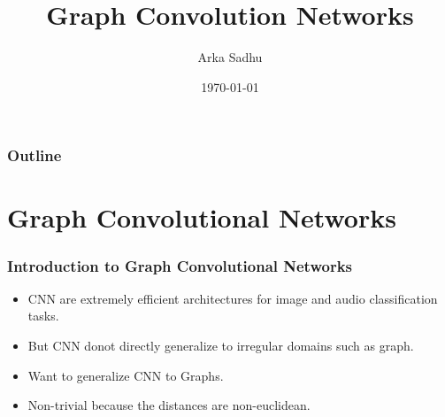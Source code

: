\documentclass{beamer}
\title{Graph Convolution Networks}
\author{Arka Sadhu}
\institute{IIT Bombay}
\date{\today}
\begin{document}


\begin{frame}
\titlepage
\end{frame}

\begin{frame}
\frametitle{Outline}
\tableofcontents
\end{frame}

\section{Graph Convolutional Networks}

\begin{frame}
  \frametitle{Introduction to Graph Convolutional Networks}
  \begin{itemize}
  \item  CNN are extremely efficient architectures for image and audio classification tasks.
  \item  But CNN donot directly generalize to irregular domains such as graph.
  \item  Want to generalize CNN to Graphs.
  \item  Non-trivial because the distances are non-euclidean.
  \end{itemize}
\end{frame}
\end{document}
